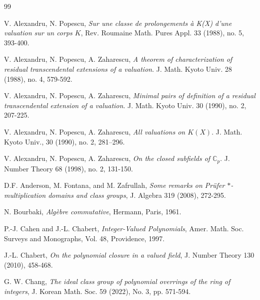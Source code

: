 \documentclass[10pt]{article}
\numberwithin{equation}{section}
\theoremstyle{definition}
\theoremstyle{definition}
\newcommand{\Z}{\mathbb{Z}}
\newcommand{\Int}{\textnormal{Int}}
\begin{document}
\begin{thebibliography}{99}


 V. Alexandru, N. Popescu, \emph{Sur une classe de prolongements \`a K(X) d'une valuation sur un corps $K$}, Rev. Roumaine Math. Pures Appl. 33 (1988), no. 5, 393-400.

 V. Alexandru, N. Popescu, A. Zaharescu, \emph{A theorem of characterization of residual transcendental extensions of a valuation}. J. Math. Kyoto Univ. 28 (1988), no. 4, 579-592.

 V. Alexandru, N. Popescu, A. Zaharescu, \emph{Minimal pairs of definition of a residual transcendental extension of a valuation}. J. Math. Kyoto Univ. 30 (1990), no. 2, 207-225.

 V. Alexandru, N. Popescu, A. Zaharescu, \emph{All valuations on $K(X)$}. J. Math. Kyoto Univ., 30 (1990), no. 2, 281–296.

 V. Alexandru, N. Popescu, A. Zaharescu, \emph{On the closed subfields of $\mathbb{C}_p$}. J. Number Theory 68 (1998), no. 2, 131-150.

 D.F. Anderson, M. Fontana, and M. Zafrullah,
{\em Some remarks on Pr\"ufer $*$-multiplication domains and class groups}, J. Algebra 319 (2008), 272-295.


 N. Bourbaki, {\em Alg\`ebre commutative}, Hermann, Paris, 1961.

 P.-J. Cahen and J.-L. Chabert, {\em Integer-Valued Polynomials},
 Amer. Math. Soc. Surveys and Monographs, Vol. 48, Providence, 1997.
 

 J.-L. Chabert, \emph{On the polynomial closure in a valued field}, J. Number Theory 130 (2010), 458-468.




 G. W. Chang, \emph{The ideal class group of polynomial overrings of the ring of integers}, J. Korean Math. Soc. 59 (2022), No. 3, pp. 571-594.


\end{thebibliography}
\end{document}
